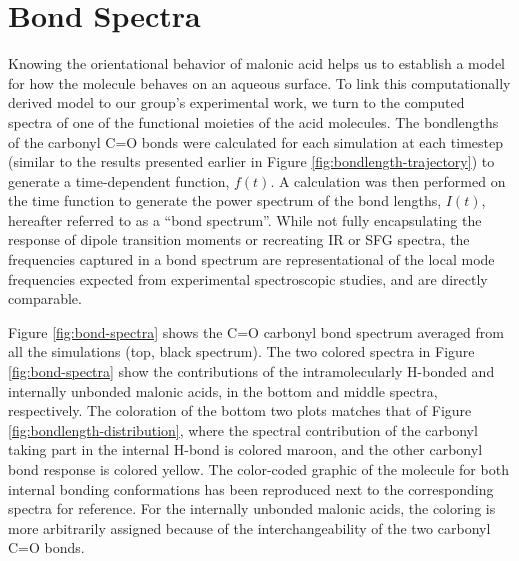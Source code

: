 \section {Bond Spectra}

Knowing the orientational behavior of malonic acid helps us to establish a model for how the molecule behaves on an aqueous surface. To link this computationally derived model to our group's experimental work, we turn to the computed spectra of one of the functional moieties of the acid molecules. The bondlengths of the carbonyl C=O bonds were calculated for each simulation at each timestep (similar to the results presented earlier in Figure \ref{fig:bondlength-trajectory}) to generate a time-dependent function, $f(t)$. A calculation was then performed on the time function to generate the power spectrum of the bond lengths, $I(t)$, hereafter referred to as a ``bond spectrum''. While not fully encapsulating the response of dipole transition moments or recreating IR or SFG spectra, the frequencies captured in a bond spectrum are representational of the local mode frequencies expected from experimental spectroscopic studies, and are directly comparable.

Figure \ref{fig:bond-spectra} shows the C=O carbonyl bond spectrum averaged from all the simulations (top, black spectrum). The two colored spectra in Figure \ref{fig:bond-spectra} show the contributions of the intramolecularly H-bonded and internally unbonded malonic acids, in the bottom and middle spectra, respectively. The coloration of the bottom two plots matches that of Figure \ref{fig:bondlength-distribution}, where the spectral contribution of the carbonyl taking part in the internal H-bond is colored maroon, and the other carbonyl bond response is colored yellow. The color-coded graphic of the molecule for both internal bonding conformations has been reproduced next to the corresponding spectra for reference. For the internally unbonded malonic acids, the coloring is more arbitrarily assigned because of the interchangeability of the two carbonyl C=O bonds.

